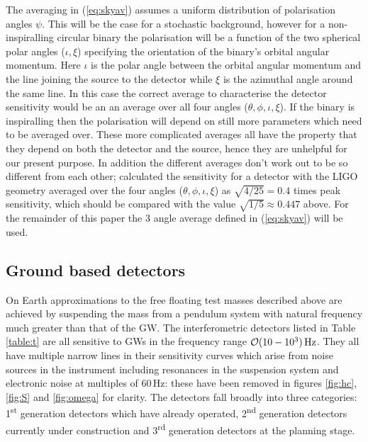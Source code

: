 The averaging in (\ref{eq:skyav}) assumes a uniform distribution of polarisation angles $\psi$. This will be the case for a stochastic background, however for a non-inspiralling circular binary the polarisation will be a function of the two spherical polar angles ($\iota,\xi$) specifying the orientation of the binary's orbital angular momentum. Here $\iota$ is the polar angle between the orbital angular momentum and the line joining the source to the detector while $\xi$ is the azimuthal angle around the same line. In this case the correct average to characterise the detector sensitivity would be an an average over all four angles ($\theta,\phi,\iota,\xi$). If the binary is inspiralling then the polarisation will depend on still more parameters which need to be averaged over. These more complicated averages all have the property that they depend on both the detector and the source, hence they are unhelpful for our present purpose. In addition the different averages don't work out to be so different from each other; \cite{1993PhRvD..47.2198F} calculated the sensitivity for a detector with the LIGO geometry averaged over the four angles ($\theta,\phi,\iota,\xi$) as $\sqrt{4/25}=0.4$ times peak sensitivity, which should be compared with the value $\sqrt{1/5}\approx 0.447$ above. For the remainder of this paper the 3 angle average defined in (\ref{eq:skyav}) will be used.

\subsection{Ground based detectors}\label{sec:ground}
On Earth approximations to the free floating test masses described above are achieved by suspending the mass from a pendulum system with natural frequency much greater than that of the GW. The interferometric detectors listed in Table \ref{table:t} are all sensitive to GWs in the frequency range ${\cal{O}}(10-10^{3})\,\textrm{Hz}$. They all have multiple narrow lines in their sensitivity curves which arise from noise sources in the instrument including resonances in the suspension system and electronic noise at multiples of $60\,\textrm{Hz}$: these have been removed in figures \ref{fig:hc}, \ref{fig:S} and \ref{fig:omega} for clarity. The detectors fall broadly into three categories: 1\textsuperscript{st} generation detectors which have already operated, 2\textsuperscript{nd} generation detectors currently under construction and 3\textsuperscript{rd} generation detectors at the planning stage. 

